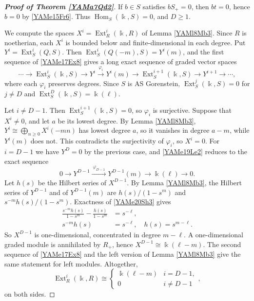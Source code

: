 \documentclass[reqno]{amsart}
\numberwithin{equation}{section}
\theoremstyle{definition}
\theoremstyle{remark}
\theoremstyle{plain}
\newcommand{\kk}{\Bbbk}
\DeclareMathOperator{\Ext}{Ext}
\DeclareMathOperator{\Hom}{Hom}
\begin{document}
\begin{proof}[\textnormal{\bfseries Proof of Theorem \ref{YAMa7Qd2}}]
If $b\in S$ satisfies $bS_+=0$, then $bt=0$, hence $b=0$ by \eqref{YAMe15Fr6}. Thus $\Hom_S(\kk,S)=0$, and $D\ge1$.

We compute the spaces $X^i=\Ext^i_R(\kk,R)$ of Lemma \ref{YAMl8Mb3}. Since $R$ is noetherian, each $X^i$ is bounded below and finite-dimensional in each degree. Put $Y^i=\Ext^i_S(Q,S)$. Then $\Ext^i_S(Q(-m),S)=Y^i(m)$, and the first sequence of \eqref{YAMe17Ex8} gives a long exact sequence of graded vector spaces
\begin{equation}\label{YAMe19Le2}
\cdots\to\Ext^i_S(\kk,S)\to Y^i\xrightarrow{\ \varphi_i\ }Y^i(m)\to\Ext^{i+1}_S(\kk,S)\to Y^{i+1}\to\cdots,
\end{equation}
where each $\varphi_i$ preserves degrees. Since $S$ is AS Gorenstein, $\Ext^j_S(\kk,S)=0$ for $j\neq D$ and $\Ext^D_S(\kk,S)=\kk(\ell)$.

Let $i\neq D-1$. Then $\Ext^{i+1}_S(\kk,S)=0$, so $\varphi_i$ is surjective. Suppose that $X^i\neq0$, and let $a$ be its lowest degree. By Lemma \ref{YAMl8Mb3}, $Y^i\cong\bigoplus_{n\ge0}X^i(-mn)$ has lowest degree $a$, so it vanishes in degree $a-m$, while $Y^i(m)$ does not. This contradicts the surjectivity of $\varphi_i$, so $X^i=0$. For $i=D-1$ we have $Y^D=0$ by the previous case, and \eqref{YAMe19Le2} reduces to the exact sequence
\begin{equation}\label{YAMe20Sh3}
0\to Y^{D-1}\xrightarrow{\ \varphi_{D-1}\ }Y^{D-1}(m)\to\kk(\ell)\to0.
\end{equation}
Let $h(s)$ be the Hilbert series of $X^{D-1}$. By Lemma \ref{YAMl8Mb3}, the Hilbert series of $Y^{D-1}$ and of $Y^{D-1}(m)$ are $h(s)/(1-s^m)$ and $s^{-m}h(s)/(1-s^m)$. Exactness of \eqref{YAMe20Sh3} gives
\begin{equation}\label{YAMe21Hs4}
\begin{aligned}
\frac{s^{-m}h(s)}{1-s^m}-\frac{h(s)}{1-s^m}&=s^{-\ell},\\
s^{-m}h(s)&=s^{-\ell},\quad h(s)=s^{m-\ell}.
\end{aligned}
\end{equation}
So $X^{D-1}$ is one-dimensional, concentrated in degree $m-\ell$. A one-dimensional graded module is annihilated by $R_+$, hence $X^{D-1}\cong\kk(\ell-m)$. The second sequence of \eqref{YAMe17Ex8} and the left version of Lemma \ref{YAMl8Mb3} give the same statement for left modules. Altogether,
\begin{equation}\label{YAMe21Hs5}
\Ext^i_R(\kk,R)\cong\begin{cases}\kk(\ell-m)&i=D-1,\\0&i\neq D-1\end{cases},
\end{equation}
on both sides.


\end{proof}
\end{document}
